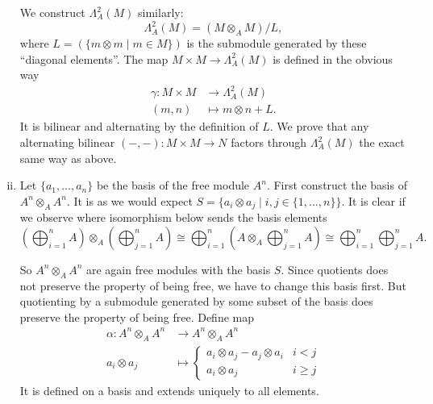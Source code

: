 \begin{exercise}{4}
\begin{enumerate}[i)]
            We construct $\Lambda^2_A(M)$ similarly:
            \begin{equation*}
                \Lambda^2_A(M) = (M \otimes_A M) / L,
            \end{equation*}
            where $L = (\{ m \otimes m \mid m \in M\})$ is the submodule
            generated by these ``diagonal elements''. The map $M \times M
            \rightarrow \Lambda^2_A(M)$ is defined in the obvious way
            \begin{align*}
                \gamma \colon M \times M &\rightarrow \Lambda^2_A(M) \\
                (m, n) &\mapsto m \otimes n + L.
            \end{align*}
            It is bilinear and alternating by the definition of $L$.
            We prove that any alternating bilinear $(-, -) \colon M \times M
            \rightarrow N$ factors through $\Lambda^2_A(M)$ the exact same way
            as above.

        \item Let $\{a_1, \ldots, a_n\}$ be the basis of the free module
            $A^n$. First construct the basis of $A^n \otimes_A A^n$. It is as we
            would expect $S = \{ a_i \otimes a_j \mid i, j \in \{1, \ldots,
            n\}\}$. It is clear if we observe where isomorphism below sends the
            basis elements
            \begin{equation*}
                (\bigoplus^n_{i=1} A) \otimes_A (\bigoplus^n_{j=1} A) \cong
                \bigoplus^n_{i=1} (A \otimes_A \bigoplus^n_{j=1} A) \cong
                \bigoplus^n_{i=1} \bigoplus^n_{j=1} A.
            \end{equation*}

            So $A^n \otimes_A A^n$ are again free modules with the basis $S$.
            Since quotients does not preserve the property of being free, we
            have to change this basis first. But quotienting by a submodule
            generated by some subset of the basis does preserve the property of
            being free. Define map
            \begin{align*}
                \alpha \colon A^n \otimes_A A^n &\rightarrow A^n \otimes_A A^n
                \\
                a_i \otimes a_j &\mapsto 
                \begin{cases} 
                    a_i \otimes a_j - a_j \otimes a_i & i < j \\
                    a_i \otimes a_j & i \geq j 
                \end{cases}
            \end{align*}
            It is defined on a basis and extends uniquely to all elements.


\end{enumerate}
\end{exercise}
